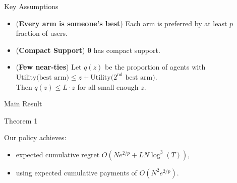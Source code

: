 \documentclass[serif]{beamer}
\begin{document}
\begin{frame}{Key Assumptions}
\begin{itemize}[label=\textbullet]
\item (\textbf{Every arm is someone's best}) Each arm is preferred by at least $p$ fraction of users.
\vspace{0.2cm}
\item (\textbf{Compact Support}) $\bm{\theta}$ has compact support.
\vspace{0.2cm}
\item (\textbf{Few near-ties}) 
Let $q(z)$ be the proportion of agents with
$\text{Utility(best arm)} \le z + \text{Utility($2^{\mathrm{nd}}$ best arm)}$.\\
Then $q(z)\leq L\cdot z$ for all small enough $z$.
\end{itemize}

\end{frame}

\begin{frame}{Main Result}
\begin{block}{Theorem 1}

Our policy achieves:
\begin{itemize}[label=\textbullet]
\item expected cumulative regret $O (N e^{2/p} + L N \log^3(T))$,
\item using expected cumulative payments of $O(N^2 e^{2/p})$.
\end{itemize}
\end{block}

\vspace{0.5cm}





\end{frame}
\end{document}
